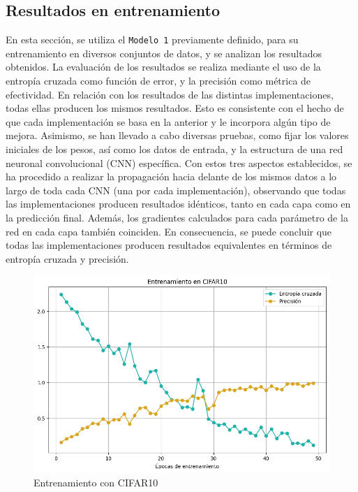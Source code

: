\subsection{Resultados en entrenamiento}

En esta sección, se utiliza el \texttt{Modelo 1} previamente definido, para su entrenamiento en diversos conjuntos de datos, y se analizan los resultados obtenidos. La evaluación de los resultados se realiza mediante el uso de la entropía cruzada como función de error, y la precisión como métrica de efectividad. En relación con los resultados de las distintas implementaciones, todas ellas producen los mismos resultados. Esto es consistente con el hecho de que cada implementación se basa en la anterior y le incorpora algún tipo de mejora. Asimismo, se han llevado a cabo diversas pruebas, como fijar los valores iniciales de los pesos, así como los datos de entrada, y la estructura de una red neuronal convolucional (CNN) específica. Con estos tres aspectos establecidos, se ha procedido a realizar la propagación hacia delante de los mismos datos a lo largo de toda cada CNN (una por cada implementación), observando que todas las implementaciones producen resultados idénticos, tanto en cada capa como en la predicción final. Además, los gradientes calculados para cada parámetro de la red en cada capa también coinciden. En consecuencia, se puede concluir que todas las implementaciones producen resultados equivalentes en términos de entropía cruzada y precisión. 

\begin{figure}[H]
	\centering
	\includegraphics[scale=0.5]{imagenes/cifar10.png}  
	\caption{Entrenamiento con CIFAR10}
	\label{fig:cifar10}
\end{figure}

